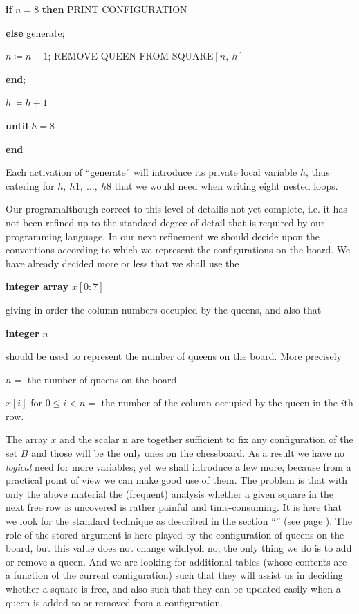 \documentclass[twoside,11pt]{book}
\begin{document}
\quad \quad \textbf{if} $n = 8$ \textbf{then} PRINT CONFIGURATION

\quad \quad \textbf{else} generate;

\quad \quad $n \coloneq n - 1$; REMOVE QUEEN FROM SQUARE$[n,\ h]$

\quad \textbf{end};

\quad $h \coloneq h + 1$

\quad \textbf{until} $h = 8$

\textbf{end}

Each activation of ``generate'' will introduce its private local variable $h$, thus catering for $h,\ h1,\ \dots,\ h8$ that we would need when writing eight nested loops.

Our program\textemdash{}although correct to this level of detail\textemdash{}is not yet complete, i.e. it has not been refined up to the standard degree of detail that is required by our programming language. In our next refinement we should decide upon the conventions according to which we represent the configurations on the board. We have already decided more or less that we shall use the

\quad \textbf{integer array} $x[0:7]$

\noindent
giving in order the column numbers occupied by the queens, and also that

\quad \textbf{integer} $n$

\noindent
should be used to represent the number of queens on the board. More precisely

$n =$ the number of queens on the board

\parindent $x[i]$ for $0 \leqslant i < n =$ the number of the column occupied by the queen in the $i$th row.

The array $x$ and the scalar n are together sufficient to fix any configuration of the set $B$ and those will be the only ones on the chessboard. As a result we have no \textit{logical} need for more variables; yet we shall introduce a few more, because from a practical point of view we can make good use of them. The problem is that with only the above material the (frequent) analysis whether a given square in the next free row is uncovered is rather painful and time-consuming. It is here that we look for the standard technique as described in the section ``'' (see page \pageref{sec:trading-storage-for-computation-speed}). The role of the stored argument is here played by the configuration of queens on the board, but this value does not change wildly\textemdash{}oh no; the only thing we do is to add or remove a queen. And we are looking for additional tables (whose contents are a function of the current configuration) such that they will assist us in deciding whether a square is free, and also such that they can be updated easily when a queen is added to or removed from a configuration.
\end{document}
